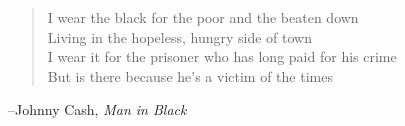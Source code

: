 \documentclass[fleqn,addpoints]{exam}
\begin{document}
\fi

\ifprintanswers
\else
\vspace{0.3 in}

{\em
\begin{verse}
I wear the black for the poor and the beaten down \\
Living in the hopeless, hungry side of town \\
I wear it for the prisoner who has long paid for his crime \\
But is there because he's a victim of the times
\end{verse}
}

\hspace{1 in} --Johnny Cash, {\em Man in Black}

\fi
\end{document}
